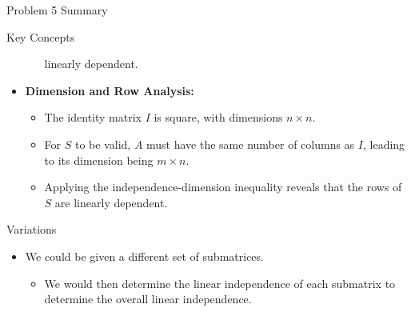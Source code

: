 \begin{summary}{Problem 5 Summary}
\begin{statement}{Key Concepts}
\begin{itemize}
\begin{itemize}
                linearly dependent.
            \end{itemize}
            \item \textbf{Dimension and Row Analysis:}
            \begin{itemize}
                \item The identity matrix $I$ is square, with dimensions $n \times n$.
                \item For $S$ to be valid, $A$ must have the same number of columns as $I$, leading to its dimension being $m \times n$.
                \item Applying the independence-dimension inequality reveals that the rows of $S$ are linearly dependent.
            \end{itemize}
        \end{itemize}
    \end{statement}
    \begin{statement}{Variations}
        \begin{itemize}
            \item We could be given a different set of submatrices.
            \begin{itemize}
                \item We would then determine the linear independence of each submatrix to determine the overall linear independence.
            \end{itemize}
        \end{itemize}
    \end{statement}
\end{summary}

